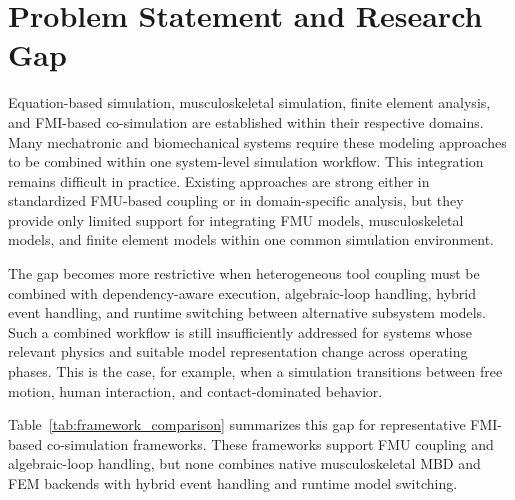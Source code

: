 \section{Problem Statement and Research Gap}
\label{sec:intro_gap_contribution}

Equation-based simulation, musculoskeletal simulation, finite element analysis, and \ac{FMI}-based co-simulation are established within their respective domains.
Many mechatronic and biomechanical systems require these modeling approaches to be combined within one system-level simulation workflow.
This integration remains difficult in practice.
Existing approaches are strong either in standardized \ac{FMU}-based coupling or in domain-specific analysis, but they provide only limited support for integrating \ac{FMU} models, musculoskeletal models, and finite element models within one common simulation environment.

The gap becomes more restrictive when heterogeneous tool coupling must be combined with dependency-aware execution, algebraic-loop handling, hybrid event handling, and runtime switching between alternative subsystem models.
Such a combined workflow is still insufficiently addressed for systems whose relevant physics and suitable model representation change across operating phases.
This is the case, for example, when a simulation transitions between free motion, human interaction, and contact-dominated behavior.

Table~\ref{tab:framework_comparison} summarizes this gap for representative \ac{FMI}-based co-simulation frameworks.
These frameworks support \ac{FMU} coupling and algebraic-loop handling, but none combines native musculoskeletal \ac{MBD} and \ac{FEM} backends with hybrid event handling and runtime model switching.

